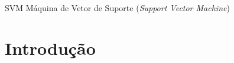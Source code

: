 \documentclass[
    12pt,       %
    oneside,    %
    a4paper,    %
%
    chapter=TITLE,	  	  %
%
    english,			  %
    brazil				  %
%
]{abntex2}
\begin{document}
\begin{siglas}
  \item[SVM] Máquina de Vetor de Suporte (\textit{Support Vector Machine})%
\end{siglas}


\tableofcontents*
\cleardoublepage{}



\textual{}
\chapter{Introdução}
\label{ch:introducao}


\end{document}

